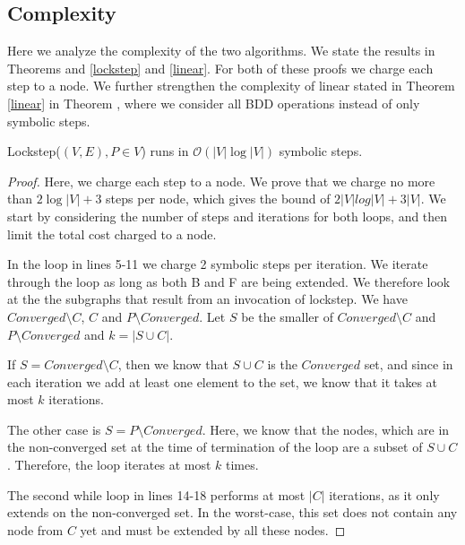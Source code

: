 \documentclass[../master/master.tex]{subfiles}
\begin{document}
\subsection{Complexity}
Here we analyze the complexity of the two algorithms. We state the results in Theorems  and \ref{lockstep} and \ref{linear}. For both of these proofs we charge each step to a node. We further strengthen the complexity of linear stated in Theorem \ref{linear} in Theorem \label{linear-strengthened}, where we consider all BDD operations instead of only symbolic steps.

\begin{theorem}\label{lockstep} Lockstep($(V, E), P\in V$) runs in $\mathcal{O}(|V|\log |V|)$ symbolic steps.
\end{theorem}
\begin{proof}
  Here, we charge each step to a node. We prove that we charge no more than $2 \log |V|+3$ steps per node, which gives the bound of $2|V|log|V|+3|V|$. We start by considering the number of steps and iterations for both loops, and then limit the total cost charged to a node.

  In the loop in lines 5-11 we charge 2 symbolic steps per iteration. We iterate through the loop as long as both B and F are being extended. We therefore look at the the subgraphs that result from an invocation of lockstep. We have $Converged\setminus C$, $C$ and $P\setminus Converged$. Let $S$ be the smaller of $Converged\setminus C$ and $P\setminus Converged$ and $k = |S\cup C|$.

  If $S = Converged\setminus C$, then we know that $S\cup C$ is the $Converged$ set, and since in each iteration we add at least one element to the set, we know that it takes at most $k$ iterations.

  The other case is $S=P\setminus Converged$. Here, we know that the nodes, which are in the non-converged set at the time of termination of the loop are a subset of $S\cup C$. Therefore, the loop iterates at most $k$ times.

  The second while loop in lines 14-18 performs at most $|C|$ iterations, as it only extends on the non-converged set. In the worst-case, this set does not contain any node from $C$ yet and must be extended by all these nodes.


\end{proof}
\end{document}
